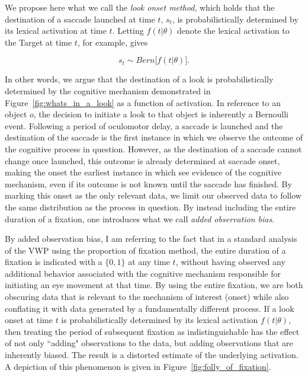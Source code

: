 \documentclass{article}
\begin{document}
We propose here what we call the \textit{look onset method}, which holds that the destination of a saccade launched at time $t$, $s_t$, is probabilistically determined by its lexical activation at time $t$. Letting $f(t|\theta)$ denote the lexical activation to the Target at time $t$, for example, gives

\begin{equation}\label{eq:onset_distribution}
s_t \sim Bern \big[ f( t  |  \theta) \big].
\end{equation}

In other words, we argue that the destination of a look is probabilistically determined by the cognitive mechanism demonstrated in Figure~\ref{fig:whats_in_a_look} as a function of activation. In reference to an object $o$, the decision to initiate a look to that object is inherently a Bernoulli event. Following a period of oculomotor delay, a saccade is launched and the destination of the saccade is the first instance in which we observe the outcome of the cognitive process in question. However, as the destination of a saccade cannot change once launched, this outcome is already determined at saccade onset, making the onset the earliest instance in which see evidence of the cognitive mechanism, even if its outcome is not known until the saccade has finished. By marking this onset as the only relevant data, we limit our observed data to follow the same distribution as the process in question. By instead including the entire duration of a fixation, one introduces what we call \textit{added observation bias}.

By added observation bias, I am referring to the fact that in a standard analysis of the VWP using the proportion of fixation method, the entire duration of a fixation is indicated with a $\{0,1\}$ at any time $t$, without having observed any additional behavior associated with the cognitive mechanism responsible for initiating an eye movement at that time. By using the entire fixation, we are both obscuring data that is relevant to the mechanism of interest (onset) while also conflating it with data generated by a fundamentally different process. If a look onset at time $t$ is probabilistically determined by its lexical activation $f(t|\theta)$, then treating the period of subsequent fixation as indistinguishable has the effect of not only ``adding" observations to the data, but adding observations that are inherently biased. The result is a distorted estimate of the underlying activation. A depiction of this phenomenon is given in Figure~\ref{fig:folly_of_fixation}.
\end{document}

